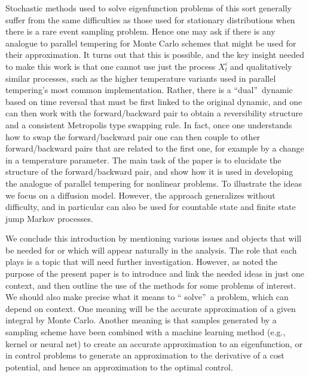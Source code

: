 \documentclass[english,11pt]{article}%
\numberwithin{equation}{section}
\numberwithin{example}{section}
\numberwithin{theorem}{section}
\begin{document}
Stochastic methods used to solve eigenfunction problems of this sort generally
suffer from the same difficulties as those used for stationary distributions
when there is a rare event sampling problem. Hence one may ask if there is
any analogue to parallel tempering for Monte Carlo schemes that might be used
for their approximation. It turns out that this is possible, and the key
insight needed to make this work is that one cannot use just the process
$X_{t}^{\varepsilon}~$and qualitatively similar processes, such as the higher
temperature variants used in parallel tempering's most common implementation.
Rather, there is a \textquotedblleft dual\textquotedblright\ dynamic based on
time reversal that must be first linked to the original dynamic, and one can
then work with the forward/backward pair to obtain a reversibility structure
and a consistent Metropolis type swapping rule. In fact, once one understands
how to swap the forward/backward pair one can then couple to other
forward/backward pairs that are related to the first one, for example by a
change in a temperature parameter. The main task of the paper is to elucidate
the structure of the forward/backward pair, and show how it is used in
developing the analogue of parallel tempering for nonlinear problems.
To illustrate the ideas we focus on a diffusion model.
However, the approach generalizes without difficulty,
and in particular can also be used for countable state and finite state jump Markov processes.

We conclude this introduction by mentioning various issues and objects that
will be needed for or which will appear naturally in the analysis. The role
that each plays is a topic that will need further investigation. However, as
noted the purpose of the present paper is to introduce and link the needed
ideas in just one context, and then outline the use of the methods for some
problems of interest. We should also 
make precise what it means to \textquotedblleft
solve\textquotedblright\ a problem, which can depend on context. One meaning will be the
accurate approximation of a given integral by Monte Carlo. Another meaning is
that samples generated by a sampling scheme have been combined with a machine learning method
(e.g., kernel or neural
net) to create an accurate approximation to an eigenfunction, or in 
control problems to generate an
approximation to the derivative of a cost potential, and hence an approximation
to the optimal control.
\end{document}
